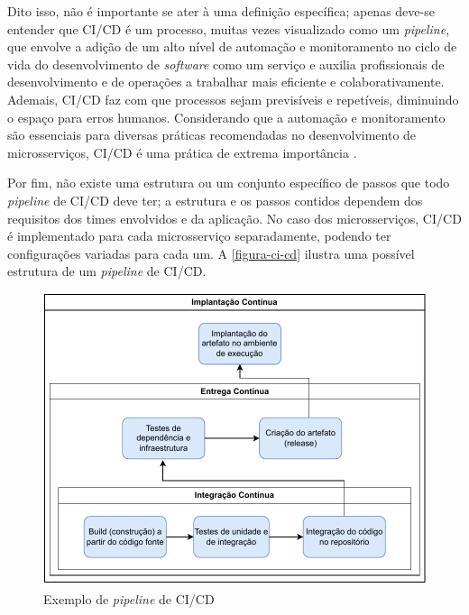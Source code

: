 Dito isso, não é importante se ater à uma definição específica; apenas deve-se entender que CI/CD é um processo, muitas vezes visualizado como um \emph{pipeline}, que envolve a adição de um alto nível de automação e monitoramento no ciclo de vida do desenvolvimento de \emph{software} como um serviço e auxilia profissionais de desenvolvimento e de operações a trabalhar mais eficiente e colaborativamente. Ademais, CI/CD faz com que processos sejam previsíveis e repetíveis, diminuindo o espaço para erros humanos. Considerando que a automação e monitoramento são essenciais para diversas práticas recomendadas no desenvolvimento de microsserviços, CI/CD é uma prática de extrema importância \cite{redhat-ci-cd, gitlab-ci-cd}.

Por fim, não existe uma estrutura ou um conjunto específico de passos que todo \emph{pipeline} de CI/CD deve ter; a estrutura e os passos contidos dependem dos requisitos dos times envolvidos e da aplicação. No caso dos microsserviços, CI/CD é implementado para cada microsserviço separadamente, podendo ter configurações variadas para cada um. A \autoref{figura-ci-cd} ilustra uma possível estrutura de um \emph{pipeline} de CI/CD. 


\begin{figure}[htb]
	\caption{\label{figura-ci-cd}Exemplo de \emph{pipeline} de CI/CD}
	\begin{center}
	    \includegraphics[scale=1]{Imagens/CICD.drawio.pdf}
	\end{center}
\end{figure}

